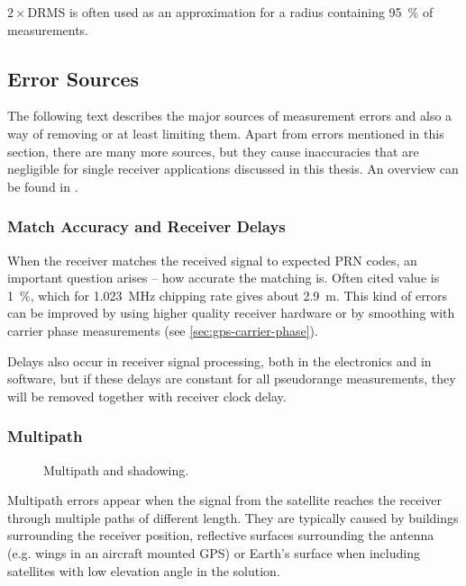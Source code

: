 \(2 \times \mathrm{DRMS}\) is often used as an approximation for a radius containing
\SI{95}{\percent} of measurements.

\subsection{Error Sources}
\label{sec:gps-errors}

The following text describes the major sources of measurement errors and also a way
of removing or at least limiting them.
Apart from errors mentioned in this section, there are many more sources, but they cause inaccuracies
that are negligible for single receiver applications discussed in this thesis.
An overview can be found in \cite{kouba09}.

\subsubsection{Match Accuracy and Receiver Delays}

When the receiver matches the received signal to expected PRN codes, an
important question arises -- how accurate the matching is.
Often cited value is \SI{1}{\percent}, which for \SI{1.023}{\mega\hertz}
chipping rate gives about \SI{2.9}{\meter}.
This kind of errors can be improved by using higher quality receiver hardware
or by smoothing with carrier phase measurements (see \cref{sec:gps-carrier-phase}).

Delays also occur in receiver signal processing, both in the electronics and in software,
but if these delays are constant for all pseudorange measurements, they will be removed
together with receiver clock delay.

\subsubsection{Multipath}

\begin{figure}[t]
	\centering
	
	\caption{Multipath and shadowing.}
	\label{fig:multipath}
\end{figure}

Multipath errors appear when the signal from the satellite reaches the receiver
through multiple paths of different length.
They are typically caused by buildings surrounding the receiver position,
reflective surfaces surrounding the antenna (e.g. wings in an aircraft mounted GPS) or Earth's surface
when including satellites with low elevation angle in the solution.


